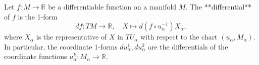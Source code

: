 Let $f: M \to \mathbb{R}$ be a differentiable function on a manifold $M$. The **differential** of $f$ is the 1-form
$$df: TM \to \mathbb{R}, \quad X \mapsto d(f \circ u_\alpha^{-1}) X_\alpha,$$
where $X_\alpha$ is the representative of $X$ in $TU_\alpha$ with respect to the chart $(u_\alpha, M_\alpha)$. In particular, the coordinate 1-forms $du_\alpha^1, du_\alpha^2$ are the differentials of the coordinate functions $u_\alpha^k: M_\alpha \to \mathbb{R}$.